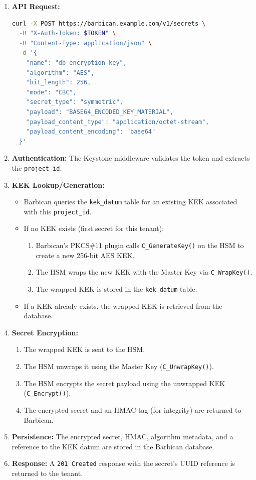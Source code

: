 \documentclass[12pt,a4paper,oneside]{report}
\begin{document}
\begin{enumerate}
    \item \textbf{API Request:}
\begin{lstlisting}[language=bash]
curl -X POST https://barbican.example.com/v1/secrets \
  -H "X-Auth-Token: $TOKEN" \
  -H "Content-Type: application/json" \
  -d '{
    "name": "db-encryption-key",
    "algorithm": "AES",
    "bit_length": 256,
    "mode": "CBC",
    "secret_type": "symmetric",
    "payload": "BASE64_ENCODED_KEY_MATERIAL",
    "payload_content_type": "application/octet-stream",
    "payload_content_encoding": "base64"
  }'
\end{lstlisting}

    \item \textbf{Authentication:} The Keystone middleware validates the token and extracts the \texttt{project\_id}.

    \item \textbf{KEK Lookup/Generation:}
    \begin{itemize}
        \item Barbican queries the \texttt{kek\_datum} table for an existing KEK associated with this \texttt{project\_id}.
        \item If no KEK exists (first secret for this tenant):
        \begin{enumerate}[label=(\alph*)]
            \item Barbican's PKCS\#11 plugin calls \texttt{C\_GenerateKey()} on the HSM to create a new 256-bit AES KEK.
            \item The HSM wraps the new KEK with the Master Key via \texttt{C\_WrapKey()}.
            \item The wrapped KEK is stored in the \texttt{kek\_datum} table.
        \end{enumerate}
        \item If a KEK already exists, the wrapped KEK is retrieved from the database.
    \end{itemize}

    \item \textbf{Secret Encryption:}
    \begin{enumerate}[label=(\alph*)]
        \item The wrapped KEK is sent to the HSM.
        \item The HSM unwraps it using the Master Key (\texttt{C\_UnwrapKey()}).
        \item The HSM encrypts the secret payload using the unwrapped KEK (\texttt{C\_Encrypt()}).
        \item The encrypted secret and an HMAC tag (for integrity) are returned to Barbican.
    \end{enumerate}

    \item \textbf{Persistence:} The encrypted secret, HMAC, algorithm metadata, and a reference to the KEK datum are stored in the Barbican database.

    \item \textbf{Response:} A \texttt{201 Created} response with the secret's UUID reference is returned to the tenant.
\end{enumerate}
\end{document}
